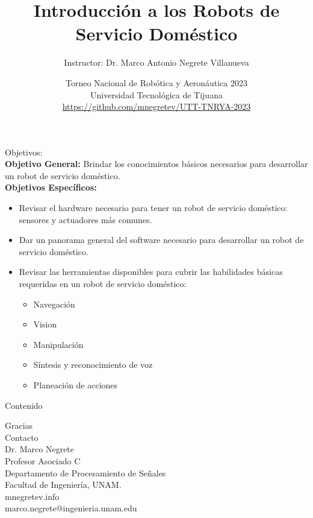 \documentclass[10pt,spanish,aspectratio=1610]{beamer}
\begin{document}
\renewcommand{\tablename}{Tabla}
\renewcommand{\figurename}{Figura}

\title[Introducción a los Robots de Servicio Doméstico]{Introducción a los Robots de Servicio Doméstico}
\author[Marco Negrete]{Instructor: Dr. Marco Antonio Negrete Villanueva}
\date[TNRYA 2023]{Torneo Nacional de Robótica y Aeronáutica 2023\\Universidad Tecnológica de Tijuana\\\url{https://github.com/mnegretev/UTT-TNRYA-2023}}

\begin{frame}
\titlepage
\end{frame}

\begin{frame}
  \Large{Objetivos:}
  \normalsize
  \[\]
  \textbf{Objetivo General:} Brindar los conocimientos básicos necesarios para desarrollar un robot de servicio doméstico.
  \\
  \textbf{Objetivos Específicos:}
  \begin{itemize}
  \item Revisar el hardware necesario para tener un robot de servicio doméstico: sensores y actuadores más comunes.
  \item Dar un panorama general del software necesario para desarrollar un robot de servicio doméstico.
  \item Revisar las herramientas disponibles para cubrir las habilidades básicas requeridas en un robot de servicio doméstico:
    \begin{itemize}
    \item Navegación
    \item Vision
    \item Manipulación
    \item Síntesis y reconocimiento de voz
    \item Planeación de acciones
    \end{itemize}
  \end{itemize}
\end{frame}

\begin{frame}
  \Large{Contenido}
  \normalsize
  \[\]

  \tableofcontents
\end{frame}



%








\begin{frame}
  \Huge{Gracias}
  \[\]
  \Large{Contacto}
  \[\]
  \large
  Dr. Marco Negrete\\
  Profesor Asociado C\\
  Departamento de Procesamiento de Señales\\
  Facultad de Ingeniería, UNAM.
\[\]
mnegretev.info\\
marco.negrete@ingenieria.unam.edu\\
\end{frame}
\end{document}

